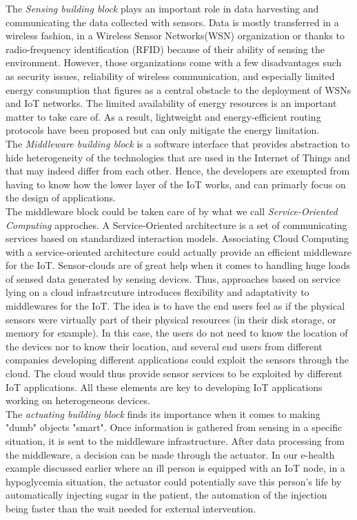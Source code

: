 The \textit{Sensing building block} plays an important role in data harvesting and communicating the data collected with sensors. Data is mostly transferred in a wireless fashion, in a Wireless Sensor Networks(WSN) organization or thanks to radio-frequency identification (RFID) because of their ability of sensing the environment. However, those organizations come with a few disadvantages such as security issues, reliability of wireless communication, and especially limited energy consumption that figures as a central obstacle to the deployment of WSNs and IoT networks. The limited availability of energy resources is an important matter to take care of. As a result, lightweight and energy-efficient routing protocols have been proposed but can only mitigate the energy limitation. \\

The \textit{Middleware building block} is a software interface that provides abstraction to hide heterogeneity of the technologies that are used in the Internet of Things and that may indeed differ from each other. Hence, the developers are exempted from having to know how the lower layer of the IoT works, and can primarly focus on the design of applications. \\

The middleware block could be taken care of by what we call \textit{Service-Oriented Computing} approches. A Service-Oriented architecture is a set of communicating services based on standardized interaction models. Associating Cloud Computing with a service-oriented architecture could actually provide an efficient middleware for the IoT. Sensor-clouds are of great help when it comes to handling huge loads of sensed data generated by sensing devices. Thus, approaches based on service lying on a cloud infrastrcuture introduces flexibility and adaptativity to middlewares for the IoT. The idea is to have the end users feel as if the physical sensors were virtually part of their physical resources (in their disk storage, or memory for example). In this case, the users do not need to know the location of the devices nor to know their location, and several end users from different companies developing different applications could exploit the sensors through the cloud. The cloud would thus provide sensor services to be exploited by different IoT applications. All these elements are key to developing IoT applications working on heterogeneous devices. \\

The \textit{actuating building block} finds its importance when it comes to making "dumb" objects "smart". Once information is gathered from sensing in a specific situation, it is sent to the middleware infrastructure. After data processing from the middleware, a decision can be made through the actuator. In our e-health example discussed earlier where an ill person is equipped with an IoT node, in a hypoglycemia situation, the actuator could potentially save this person's life by automatically injecting sugar in the patient, the automation of the injection being faster than the wait needed for external intervention. \\

